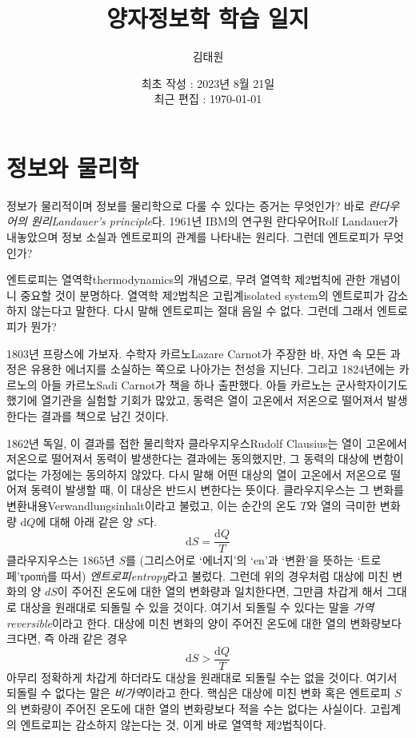 \documentclass[a4paper,chapter,atbegshi]{oblivoir}
\title{양자정보학 학습 일지}
\author{김태원}
\date{최초 작성 : 2023년 8월 21일 \\ 최근 편집 : \today}
\begin{document}
\maketitle

\chapter{정보와 물리학}
정보가 물리적이며 정보를 물리학으로 다룰 수 있다는 증거는 무엇인가? 바로
\emph{란다우어의 원리\tiny Landauer's principle}다. 1961년 IBM의 연구원
란다우어{\tiny Rolf Landauer}가 내놓았으며 정보 소실과 엔트로피의 관계를
나타내는 원리다. 그런데 엔트로피가 무엇인가?

엔트로피는 열역학{\tiny thermodynamics}의 개념으로, 무려 열역학 제2법칙에
관한 개념이니 중요할 것이 분명하다. 열역학 제2법칙은 고립계{\tiny isolated
system}의 엔트로피가 감소하지 않는다고 말한다.
다시 말해 엔트로피는 절대 음일 수 없다. 그런데 그래서 엔트로피가 뭔가? 

1803년 프랑스에 가보자. 수학자 카르노{\tiny Lazare Carnot}가 주장한 바, 자연
속 모든 과정은 유용한 에너지를 소실하는 쪽으로 나아가는 천성을 지닌다. 그리고 
1824년에는 카르노의 아들 카르노{\tiny Sadi Carnot}가 책을 하나 출판했다.
아들 카르노는 군사학자이기도 했기에 열기관을 실험할 기회가 많았고, 동력은
열이 고온에서 저온으로 떨어져서 발생한다는 결과를 책으로 남긴 것이다.

1862년 독일, 이 결과를 접한 물리학자 클라우지우스{\tiny Rudolf Clausius}는 
열이 고온에서 저온으로 떨어져서 동력이 발생한다는 결과에는 동의했지만, 
그 동력의 대상에 변함이 없다는 가정에는 동의하지 않았다. 다시 말해 어떤
대상의 열이 고온에서 저온으로 떨어져 동력이 발생할 때, 이 대상은 반드시
변한다는 뜻이다. 클라우지우스는 그 변화를 변환내용{\tiny Verwandlungsinhalt}이라고
불렀고, 이는 순간의 온도 $T$와 열의 극미한 변화량 $\textrm{d}Q$에 대해 
아래 같은 양 $S$다.
\begin{equation}
  \textrm{d}S = \frac{\textrm{d}Q}{T}
\end{equation}
클라우지우스는 1865년 $S$를 (그리스어로 `에너지'의 `en'과 `변환'을 뜻하는
`트로페'{\tiny τροπή}를 따서) \emph{엔트로피\tiny entropy}라고 불렀다. 그런데
위의 경우처럼 대상에 미친 변화의 양 $dS$이 주어진 온도에 대한 열의 변화량과
일치한다면, 그만큼 차갑게 해서 그대로 대상을 원래대로 되돌릴 수 있을 것이다.
여기서 되돌릴 수 있다는 말을 \emph{가역\tiny reversible}이라고 한다. 대상에
미친 변화의 양이 주어진 온도에 대한 열의 변화량보다 크다면, 즉 아래 같은 경우
\begin{equation}\label{eq:12}
  \textrm{d}S > \frac{\textrm{d}Q}{T}
\end{equation}
아무리 정확하게 차갑게 하더라도 대상을 원래대로 되돌릴 수는 없을 것이다. 여기서
되돌릴 수 없다는 말은 \emph{비가역}이라고 한다. 핵심은 대상에 미친 변화 혹은
엔트로피 $S$의 변화량이 주어진 온도에 대한 열의 변화량보다 적을 수는 없다는
사실이다. 고립계의 엔트로피는 감소하지 않는다는 것, 이게 바로 열역학 제2법칙이다.
\end{document}
